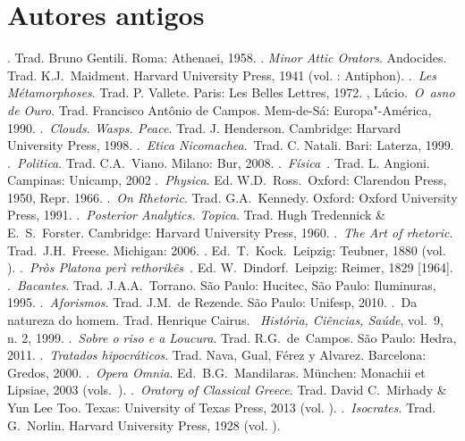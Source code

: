  

\section{Autores antigos}

 

\begin{bibliohedra}
. Trad. Bruno Gentili. Roma: Athenaei, 1958.
. \emph{Minor Attic Orators}.
  Andocides. Trad. K.J.~Maidment. Harvard University Press, 1941 (vol. : Antiphon).
.~\emph{Les Métamorphoses}. Trad. P. Vallete. Paris: Les Belles
  Lettres, 1972.
, Lúcio.~\emph{O~asno de Ouro}. Trad. Francisco Antônio de
  Campos. Mem-de-Sá: Europa"-América, 1990.
.~\emph{Clouds. Wasps. Peace}. Trad. J. Henderson. Cambridge: Harvard
  University Press, 1998.
.~\emph{Etica Nicomachea}.~Trad. C. Natali. Bari: Laterza,
  1999.
.~\emph{Politica}. Trad. C.A.~Viano. Milano: Bur, 2008.
.~\emph{Física~}. Trad. L. Angioni. Campinas: Unicamp,
  2002
.~\emph{Physica}. Ed. W.D.~Ross.~Oxford: Clarendon Press,
  1950, Repr. 1966.
.~\emph{On Rhetoric}. Trad. G.A.~Kennedy. Oxford: Oxford
  University Press, 1991.
.~\emph{Posterior Analytics. Topica}. Trad. Hugh Tredennick
  \& E.~S.~Forster. Cambridge: Harvard University Press, 1960.
.~\emph{The Art of rhetoric}. Trad.~J.H.~Freese. Michigan:
  2006.
. Ed.~T.~Kock.~Leipzig: Teubner, 1880 (vol. ).
.~\emph{Pròs Platona perì rethorikês~}. Ed. W.~Dindorf.~Leipzig: Reimer, 1829 [1964].
.~\emph{Bacantes}. Trad. J.A.A.~Torrano. São Paulo: Hucitec,
  São Paulo: Iluminuras, 1995.
.~\emph{Aforismos}. Trad. J.M.~de Rezende. São Paulo:
  Unifesp, 2010.
.~Da natureza do homem. Trad. Henrique Cairus.
  ~\emph{História, Ciências, Saúde}, vol.~9, n. 2, 1999.
.~\emph{Sobre o riso e a Loucura}. Trad. R.G.~de~Campos.
  São Paulo: Hedra, 2011.
.~\emph{Tratados hipocráticos}. Trad. Nava, Gual, Férez y
  Alvarez. Barcelona: Gredos, 2000.
.~\emph{Opera Omnia}. Ed.~B.G.~Mandilaras. München:
  Monachii et Lipsiae, 2003 (vols.~).
.~\emph{Oratory of Classical Greece}. Trad. David C.~Mirhady \&
  Yun Lee Too. Texas: University of Texas Press, 2013 (vol. ).
.~\emph{Isocrates}. Trad. G.~Norlin. Harvard University Press, 1928 (vol. ).

\end{bibliohedra}
